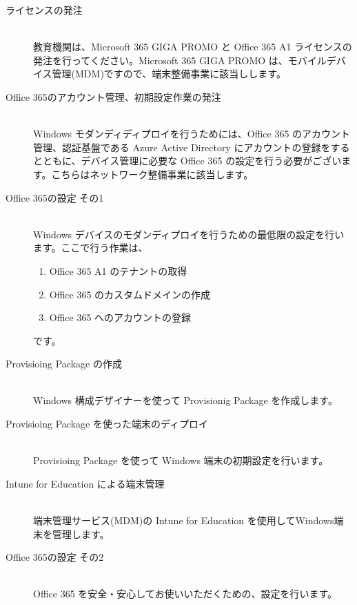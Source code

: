 \begin{description}
    \item[ライセンスの発注]\mbox{}\\
    教育機関は、Microsoft 365 GIGA PROMO と Office 365 A1 ライセンスの発注を行ってください。Microsoft 365 GIGA PROMO は、モバイルデバイス管理(MDM)ですので、端末整備事業に該当しします。
    \item[Office 365のアカウント管理、初期設定作業の発注]\mbox{}\\
    Windows モダンディディプロイを行うためには、Office 365 のアカウント管理、認証基盤である Azure Active Directory にアカウントの登録をするとともに、デバイス管理に必要な Office 365 の設定を行う必要がございます。こちらはネットワーク整備事業に該当します。
    \item[Office 365の設定 その1]\mbox{}\\
    Windows デバイスのモダンディプロイを行うための最低限の設定を行います。ここで行う作業は、
        \begin{enumerate}
            \item Office 365 A1 のテナントの取得
            \item Office 365 のカスタムドメインの作成
            \item Office 365 へのアカウントの登録
        \end{enumerate}
    です。
    \item[Provisioing Package の作成]\mbox{}\\
    Windows 構成デザイナーを使って Provisionig Package を作成します。
    \item[Provisioing Package を使った端末のディプロイ] \mbox{}\\
    Provisioing Package を使って Windows 端末の初期設定を行います。
    \item[Intune for Education による端末管理] \mbox{}\\
    端末管理サービス(MDM)の Intune for Education を使用してWindows端末を管理します。
    \item[Office 365の設定 その2] \mbox{}\\
    Office 365 を安全・安心してお使いいただくための、設定を行います。
    
\end{description}
